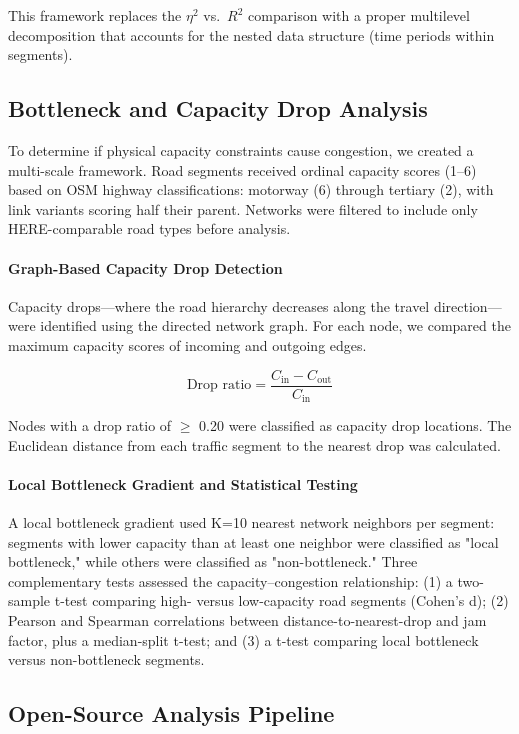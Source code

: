 \documentclass[12pt,a4paper]{article}
\begin{document}
This framework replaces the $\eta^2$ vs.\ $R^2$ comparison with a proper multilevel decomposition that accounts for the nested data structure (time periods within segments).

\subsection{Bottleneck and Capacity Drop Analysis}

To determine if physical capacity constraints cause congestion, we created a multi-scale framework. Road segments received ordinal capacity scores (1–6) based on OSM highway classifications: motorway (6) through tertiary (2), with link variants scoring half their parent. Networks were filtered to include only HERE-comparable road types before analysis.

\paragraph{Graph-Based Capacity Drop Detection}

Capacity drops—where the road hierarchy decreases along the travel direction—were identified using the directed network graph. For each node, we compared the maximum capacity scores of incoming and outgoing edges.

\[\text{Drop ratio} = \frac{C_{\text{in}} - C_{\text{out}}}{C_{\text{in}}}\]

Nodes with a drop ratio of  $\geq$ 0.20 were classified as capacity drop locations. The Euclidean distance from each traffic segment to the nearest drop was calculated.

\paragraph{Local Bottleneck Gradient and Statistical Testing}

A local bottleneck gradient used K=10 nearest network neighbors per segment: segments with lower capacity than at least one neighbor were classified as "local bottleneck," while others were classified as "non-bottleneck." Three complementary tests assessed the capacity–congestion relationship: (1) a two-sample t-test comparing high- versus low-capacity road segments (Cohen's d); (2) Pearson and Spearman correlations between distance-to-nearest-drop and jam factor, plus a median-split t-test; and (3) a t-test comparing local bottleneck versus non-bottleneck segments.

\subsection{Open-Source Analysis Pipeline}
\end{document}
